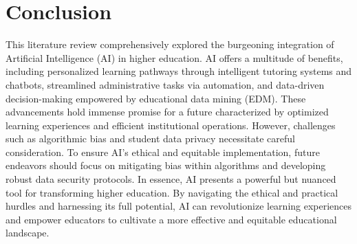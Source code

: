 \section{Conclusion}
This literature review comprehensively explored the burgeoning integration of Artificial Intelligence (AI) in higher education.
AI offers a multitude of benefits, including personalized learning pathways through intelligent tutoring systems and chatbots,
streamlined administrative tasks via automation, and data-driven decision-making empowered by educational data mining (EDM).
These advancements hold immense promise for a future characterized by optimized learning experiences and efficient institutional
operations. However, challenges such as algorithmic bias and student data privacy necessitate careful consideration.
To ensure AI's ethical and equitable implementation, future endeavors should focus on mitigating bias within algorithms and developing
robust data security protocols. In essence, AI presents a powerful but nuanced tool for transforming higher education.
By navigating the ethical and practical hurdles and harnessing its full potential, AI can revolutionize learning experiences
and empower educators to cultivate a more effective and equitable educational landscape.
